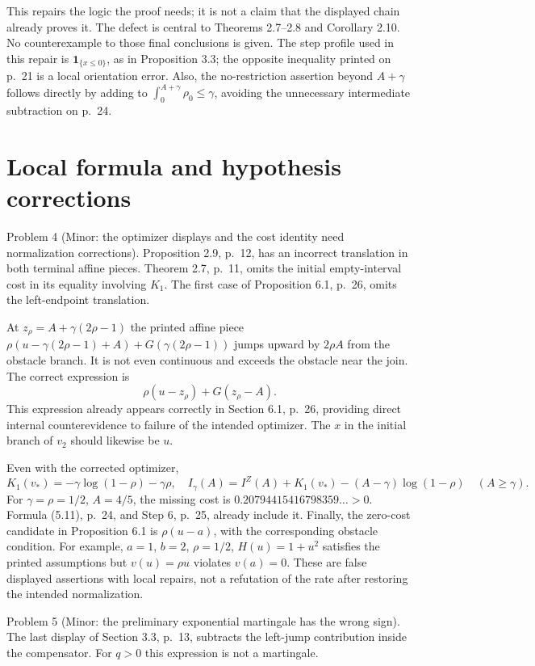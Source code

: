 \documentclass[10pt]{article}
\begin{document}
This repairs the logic the proof needs; it is not a claim that the displayed chain already proves it. The defect is central to Theorems 2.7–2.8 and Corollary 2.10. No counterexample to those final conclusions is given. The step profile used in this repair is \(\mathbf1_{\{x\leq0\}}\), as in Proposition 3.3; the opposite inequality printed on p. 21 is a local orientation error. Also, the no-restriction assertion beyond \(A+\gamma\) follows directly by adding to \(\int_0^{A+\gamma}\rho_0\leq\gamma\), avoiding the unnecessary intermediate subtraction on p. 24.\par
\section*{Local formula and hypothesis corrections}
Problem 4 (Minor: the optimizer displays and the cost identity need normalization corrections).  Proposition 2.9, p. 12, has an incorrect translation in both terminal affine pieces. Theorem 2.7, p. 11, omits the initial empty-interval cost in its equality involving \(K_1\). The first case of Proposition 6.1, p. 26, omits the left-endpoint translation.\par
At \(z_\rho=A+\gamma(2\rho-1)\) the printed affine piece \(\rho(u-\gamma(2\rho-1)+A)+G(\gamma(2\rho-1))\) jumps upward by \(2\rho A\) from the obstacle branch. It is not even continuous and exceeds the obstacle near the join. The correct expression is \[\rho(u-z_\rho)+G(z_\rho-A).\] This expression already appears correctly in Section 6.1, p. 26, providing direct internal counterevidence to failure of the intended optimizer. The \(x\) in the initial branch of \(v_2\) should likewise be \(u\).\par
Even with the corrected optimizer, \[K_1(v_*)=-\gamma\log(1-\rho)-\gamma\rho,
\quad
 I_\gamma(A)=I^Z(A)+K_1(v_*)-(A-\gamma)\log(1-\rho)
 \quad(A\geq\gamma).\] For \(\gamma=\rho=1/2\), \(A=4/5\), the missing cost is \(0.20794415416798359\ldots>0\). Formula (5.11), p. 24, and Step 6, p. 25, already include it. Finally, the zero-cost candidate in Proposition 6.1 is \(\rho(u-a)\), with the corresponding obstacle condition. For example, \(a=1\), \(b=2\), \(\rho=1/2\), \(H(u)=1+u^2\) satisfies the printed assumptions but \(v(u)=\rho u\) violates \(v(a)=0\). These are false displayed assertions with local repairs, not a refutation of the rate after restoring the intended normalization.\par
Problem 5 (Minor: the preliminary exponential martingale has the wrong sign).  The last display of Section 3.3, p. 13, subtracts the left-jump contribution inside the compensator. For \(q>0\) this expression is not a martingale.\par
\end{document}
